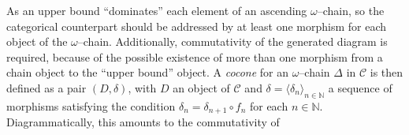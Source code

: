 As an upper bound ``dominates'' each element of an ascending \(\omega\)--chain, so the categorical counterpart should be addressed by at least one morphism for each object of the \(\omega\)--chain. %
Additionally, commutativity of the generated diagram is required, because of the possible existence of more than one morphism from a chain object to the ``upper bound'' object.
A \emph{cocone} for an \(\omega\)--chain \(\Delta\) in \(\mathcal{C}\) is %
then defined as a pair \((D, \delta)\), with \(D\) an object of
\(\mathcal{C}\) and \(\delta = {\langle\delta_n\rangle}_{n\in\mathbb{N}}\)
a sequence of morphisms satisfying the condition
\(\delta_n = \delta_{n+1} \circ f_n\) for each \(n \in \mathbb{N}\). Diagrammatically, this amounts to the commutativity of
  \begin{center}
  \end{center}

